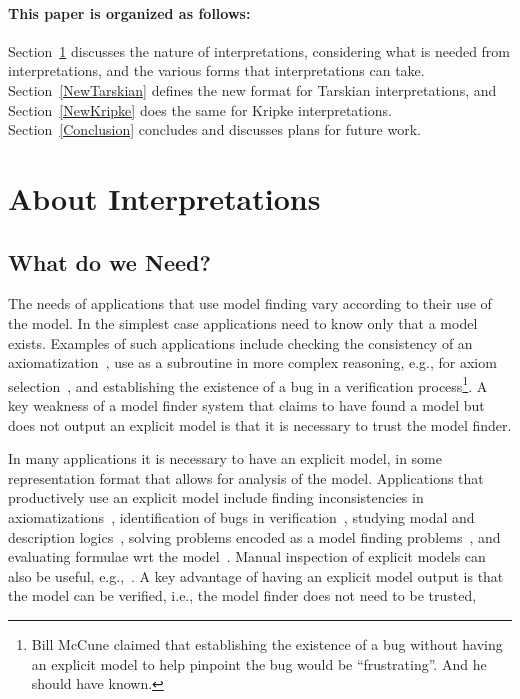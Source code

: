 \documentclass{easychair}
\begin{document}
\paragraph{This paper is organized as follows:}
Section~\ref{Interpretations} discusses the nature of interpretations, considering what is
needed from interpretations, and the various forms that interpretations can take.
Section~\ref{NewTarskian} defines the new format for Tarskian interpretations, and
Section~\ref{NewKripke} does the same for Kripke interpretations.
Section~\ref{Conclusion} concludes and discusses plans for future work.

\section{About Interpretations}
\label{Interpretations}

\subsection{What do we Need?}
\label{Need}

The needs of applications that use model finding vary according to their use of the model.
In the simplest case applications need to know only that a model exists.
Examples of such applications include checking the consistency of an axiomatization~\cite{CI15},
use as a subroutine in more complex reasoning, e.g., for
axiom selection~\cite{SP07,Pud07-ESARLT}, and establishing the existence of a bug in a
verification process\footnote{%
Bill McCune claimed that establishing the existence of a bug without having an explicit model
to help pinpoint the bug would be ``frustrating''. And he should have known.}.
A key weakness of a model finder system that claims to have found a model but does not output an 
explicit model is that it is necessary to trust the model finder.

In many applications it is necessary to have an explicit model, in some representation format that
allows for analysis of the model.
Applications that productively use an explicit model include finding inconsistencies in 
axiomatizations~\cite{SS+17}, identification of bugs in verification~\cite{CE82,QS82},
studying modal and description logics~\cite{SH13}, solving problems encoded as a model finding 
problems~\cite{Win82}, and evaluating formulae wrt the model~\cite{SS+23-LPAR}.
Manual inspection of explicit models can also be useful, e.g.,~\cite{EK+10}.
A key advantage of having an explicit model output is that the model can be verified, i.e., the
model finder does not need to be trusted,
\end{document}
